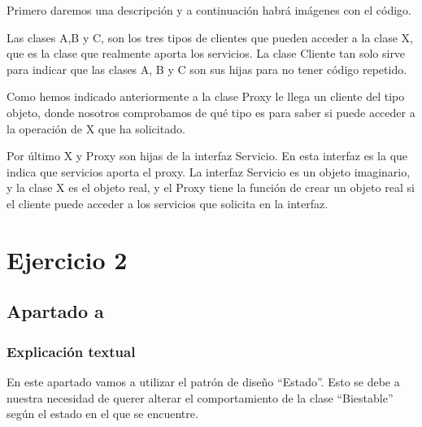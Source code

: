\documentclass[11pt,a4paper]{article}
\begin{document}
Primero daremos una descripción y a continuación habrá imágenes con el código.

	Las clases A,B y C, son los tres tipos de clientes que pueden acceder a la clase X, que es la clase que realmente aporta los servicios. La clase Cliente tan solo sirve para indicar que las clases A, B y C son sus hijas para no tener código repetido.

	Como hemos indicado anteriormente a la clase Proxy le llega un cliente del tipo objeto, donde nosotros comprobamos de qué tipo es para saber si puede acceder a la operación de X que ha solicitado.
	
	Por último X y Proxy son hijas de la interfaz Servicio. En esta interfaz es la que indica que servicios aporta el proxy. La interfaz Servicio es un objeto imaginario, y la clase X es el objeto real, y el Proxy tiene la función de crear un objeto real si el cliente puede acceder a los servicios que solicita en la interfaz.

















\section{Ejercicio 2}
\subsection{Apartado a}

\subsubsection{Explicación textual}

En este apartado vamos a utilizar el patrón de diseño ``Estado''. Esto se debe a nuestra necesidad de querer alterar el comportamiento de la clase ``Biestable'' según el estado en el que se encuentre.
\end{document}
